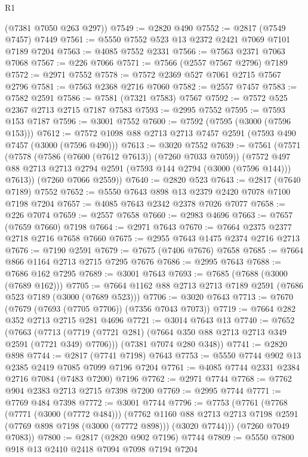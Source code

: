 \begin{lexlean}{R1}
\begin{coremodule}
      (@7381 @7050 @263 @297))
@7549 := @2820 @490
@7552 := @2817 (@7549 @7457) @7449
@7561 := @5550 @7552 @523 @13 @2372 @2421 @7069 @7101 @7189 @7204
@7563 := @4085 @7552 @2331
@7566 := @7563 @2371 @7063 @7068
@7567 := @226 @7066
@7571 := @7566 (@2557 @7567 @2796) @7189
@7572 := @2971 @7552
@7578 := @7572 @2369 @527 @7061 @2715 @7567 @2796
@7581 := @7563 @2368 @2716 @7060
@7582 := @2557 @7457
@7583 := @7582 @2591
@7586 := @7581 (@7321 @7583) @7567
@7592 := @7572 @525 @2367 @2713 @2715 @7187 @7583
@7593 := @2995 @7552
@7595 := @7593 @153 @7187
@7596 := @3001 @7552
@7600 := @7592 (@7595 (@3000 (@7596 @153)))
@7612 := @7572 @1098 @88 @2713 @2713 @7457 @2591 (@7593 @490 @7457 (@3000 (@7596 @490)))
@7613 := @3020 @7552
@7639 := @7561
    (@7571
      (@7578
        (@7586 (@7600 (@7612 @7613)) (@7260 @7033 @7059))
        (@7572 @497 @88 @2713 @2713 @2794 @2591 (@7593 @144 @2794 (@3000 (@7596 @144))) @7613))
      (@7260 @7066 @2559))
@7640 := @2820 @523
@7643 := @2817 (@7640 @7189) @7552
@7652 := @5550 @7643 @898 @13 @2379 @2420 @7078 @7100 @7198 @7204
@7657 := @4085 @7643 @2342 @2378 @7026 @7077
@7658 := @226 @7074
@7659 := @2557 @7658
@7660 := @2983 @4696
@7663 := @7657 (@7659 @7660) @7198
@7664 := @2971 @7643
@7670 := @7664 @2375 @2377 @2718 @2716 @7658 @7660
@7675 := @2955 @7643 @1475 @2374 @2716 @2713
@7676 := @7190 @2591
@7679 := @7675 (@7406 @7676) @7658
@7685 := @7664 @866 @1164 @2713 @2715 @7295 @7676
@7686 := @2995 @7643
@7688 := @7686 @162 @7295
@7689 := @3001 @7643
@7693 := @7685 (@7688 (@3000 (@7689 @162)))
@7705 := @7664 @1162 @88 @2713 @2713 @7189 @2591 (@7686 @523 @7189 (@3000 (@7689 @523)))
@7706 := @3020 @7643
@7713 := @7670 (@7679 (@7693 (@7705 @7706)) (@7356 @7043 @7073))
@7719 := @7664 @282 @352 @2713 @2715 @281 @4696
@7721 := @3014 @7643 @13
@7740 := @7652
    (@7663
      (@7713 (@7719 (@7721 @281) (@7664 @350 @88 @2713 @2713 @349 @2591 (@7721 @349) @7706)))
      (@7381 @7074 @280 @348))
@7741 := @2820 @898
@7744 := @2817 (@7741 @7198) @7643
@7753 := @5550 @7744 @902 @13 @2385 @2419 @7085 @7099 @7196 @7204
@7761 := @4085 @7744 @2331 @2384 @2716 @7084 (@7483 @7200) @7196
@7762 := @2971 @7744
@7768 := @7762 @904 @2383 @2713 @2715 @7398 @7200
@7769 := @2995 @7744
@7771 := @7769 @484 @7398
@7772 := @3001 @7744
@7796 := @7753
    (@7761
      (@7768
        (@7771 (@3000 (@7772 @484)))
        (@7762
          @1160
          @88
          @2713
          @2713
          @7198
          @2591
          (@7769 @898 @7198 (@3000 (@7772 @898)))
          (@3020 @7744)))
      (@7260 @7049 @7083))
@7800 := @2817 (@2820 @902 @7196) @7744
@7809 := @5550 @7800 @918 @13 @2410 @2418 @7094 @7098 @7194 @7204

\end{coremodule}
\end{lexlean}
